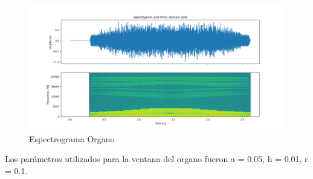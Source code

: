 \begin{figure}[H]
	\centering
	\includegraphics[width=0.7\linewidth]{ImagenesEjercicio7/EspectogramaOrganoEscala}
	\caption{Espectrograma Organo}
	\label{fig:espectogramaorganoescala}
\end{figure}
Los parámetros utilizados para la ventana del organo fueron
a = 0.05, h = 0.01, r = 0.1.

